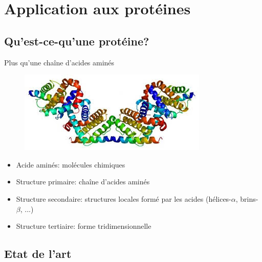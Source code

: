 \documentclass{beamer}
\begin{document}
\section{Application aux protéines}

\subsection{Qu'est-ce-qu'une protéine?}

\begin{frame}{Plus qu'une chaîne d'acides aminés}
  \begin{figure}
    \centering
    \includegraphics[scale=0.3]{../Figures/prot}
  \end{figure}
    \begin{itemize}
    \item Acide aminés: molécules chimiques
    \item Structure primaire: chaîne d'acides aminés
    \item Structure secondaire: structures locales formé par les acides
      (hélices-$\alpha$, brins-$\beta$, ...)
    \item Structure tertiaire: forme tridimensionnelle
    \end{itemize}
\end{frame}

\subsection{Etat de l'art}
\end{document}
